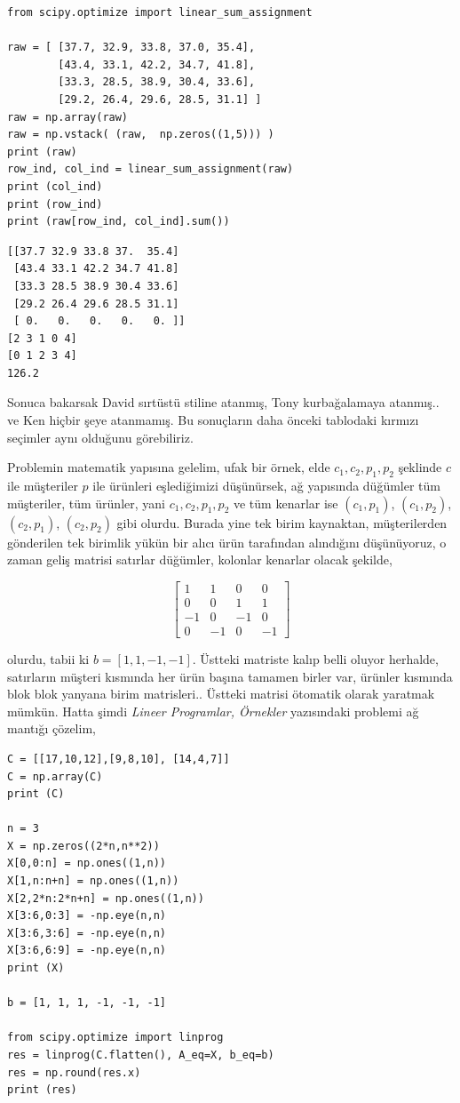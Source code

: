 \documentclass[12pt,fleqn]{article}\usepackage{../../common}
\begin{document}
\begin{verbatim}
from scipy.optimize import linear_sum_assignment

raw = [ [37.7, 32.9, 33.8, 37.0, 35.4],
        [43.4, 33.1, 42.2, 34.7, 41.8],
        [33.3, 28.5, 38.9, 30.4, 33.6],
        [29.2, 26.4, 29.6, 28.5, 31.1] ]
raw = np.array(raw)
raw = np.vstack( (raw,  np.zeros((1,5))) )
print (raw)
row_ind, col_ind = linear_sum_assignment(raw)
print (col_ind)
print (row_ind)
print (raw[row_ind, col_ind].sum())
\end{verbatim}

\begin{verbatim}
[[37.7 32.9 33.8 37.  35.4]
 [43.4 33.1 42.2 34.7 41.8]
 [33.3 28.5 38.9 30.4 33.6]
 [29.2 26.4 29.6 28.5 31.1]
 [ 0.   0.   0.   0.   0. ]]
[2 3 1 0 4]
[0 1 2 3 4]
126.2
\end{verbatim}

Sonuca bakarsak David sırtüstü stiline atanmış, Tony kurbağalamaya
atanmış.. ve Ken hiçbir şeye atanmamış. Bu sonuçların daha önceki tablodaki
kırmızı seçimler aynı olduğunu görebiliriz.

Problemin matematik yapısına gelelim, ufak bir örnek, elde
$c_1,c_2,p_1,p_2$ şeklinde $c$ ile müşteriler $p$ ile ürünleri eşlediğimizi
düşünürsek, ağ yapısında düğümler tüm müşteriler, tüm ürünler, yani
$c_1,c_2,p_1,p_2$ ve tüm kenarlar ise $(c_1,p_1)$, $(c_1,p_2)$,
$(c_2,p_1)$, $(c_2,p_2)$ gibi olurdu. Burada yine tek birim kaynaktan,
müşterilerden gönderilen tek birimlik yükün bir alıcı ürün tarafından
alındığını düşünüyoruz, o zaman geliş matrisi satırlar düğümler, kolonlar
kenarlar olacak şekilde,

$$
\left[\begin{array}{rrrr}
1  & 1 &  0 & 0 \\
0  & 0 &  1 & 1 \\
-1 & 0 & -1 & 0 \\
0  &-1 &  0 &-1  
\end{array}\right]
$$

olurdu, tabii ki $b = [1,1,-1,-1]$. Üstteki matriste kalıp belli oluyor
herhalde, satırların müşteri kısmında her ürün başına tamamen birler var,
ürünler kısmında blok blok yanyana birim matrisleri.. Üstteki matrisi
ötomatik olarak yaratmak mümkün. Hatta şimdi {\em Lineer Programlar,
 Örnekler} yazısındaki problemi ağ mantığı çözelim, 

\begin{verbatim}
C = [[17,10,12],[9,8,10], [14,4,7]]
C = np.array(C)
print (C)

n = 3
X = np.zeros((2*n,n**2))
X[0,0:n] = np.ones((1,n))
X[1,n:n+n] = np.ones((1,n))
X[2,2*n:2*n+n] = np.ones((1,n))
X[3:6,0:3] = -np.eye(n,n)
X[3:6,3:6] = -np.eye(n,n)
X[3:6,6:9] = -np.eye(n,n)
print (X)

b = [1, 1, 1, -1, -1, -1]

from scipy.optimize import linprog
res = linprog(C.flatten(), A_eq=X, b_eq=b)
res = np.round(res.x)
print (res)
\end{verbatim}
\end{document}
